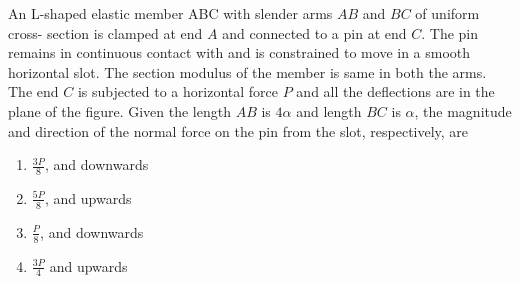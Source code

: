 \item{
An L-shaped elastic member ABC with slender arms $AB$ and $BC$ of uniform cross- section is clamped at end $A$ and connected to a pin at end $C$. The pin remains in continuous contact with and is constrained to move in a smooth horizontal slot. The section modulus of the member is same in both the arms. The end $C$ is subjected to a horizontal force $P$ and all the deflections are in the plane of the figure. Given the length $AB$ is $4\alpha$ and length $BC$ is $\alpha$, the magnitude and direction of the normal force on the pin from the slot, respectively, are
\begin{figure}[H]
\centering
{}%

\label{fig:my_label}
\end{figure}
\begin{multicols}{2}
    \begin{enumerate}
        \item $\frac{3P}{8}$, and downwards
        \item $\frac{5P}{8}$, and upwards
        \item $\frac{P}{8}$, and downwards
        \item $\frac{3P}{4}$ and upwards
    \end{enumerate}
\end{multicols}
}
